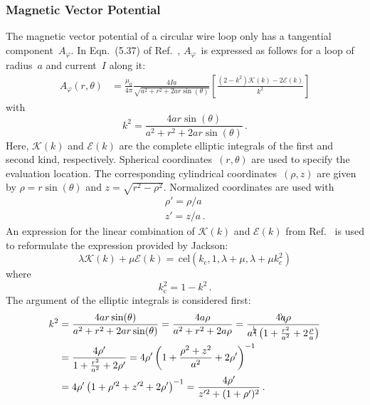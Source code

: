 \subsubsection{Magnetic Vector Potential}
The magnetic vector potential of a circular wire loop
only has a tangential component~$A_\varphi$.
In Eqn.~(5.37) of Ref.~\cite{jackson}, $A_\varphi$~is expressed as
follows for a loop of radius~$a$ and current~$I$ along it:
\begin{align}
  A_\varphi(r, \theta) &= \frac{\mu_0}{4 \pi}
                          \frac{4 I a}{\sqrt{a^2 + r^2 + 2 a r \sin(\theta)}}
                          \left[
                            \frac{(2 - k^2)\mathcal{K}(k) - 2 \mathcal{E}(k)}{k^2}
                          \right] \label{eqn:cwl_A_phi_Jackson}
\end{align}
with
\begin{equation}
  k^2 = \frac{4 a r \sin(\theta)}{a^2 + r^2 + 2 a r \sin(\theta)} \, .
\end{equation}
Here, $\mathcal{K}(k)$ and $\mathcal{E}(k)$ are the complete elliptic integrals of the first and second kind, respectively.
Spherical coordinates~$(r, \theta)$ are used to specify the evaluation location.
The corresponding cylindrical coordinates~$(\rho, z)$ are given by
$\rho = r \sin(\theta)$ and $z = \sqrt{r^2 - \rho^2}$.
Normalized coordinates are used with
\begin{align}
  \rho' = \rho / a \label{eqn:rhoP} \\
    z'  =   z  / a \label{eqn:zP} \, .
\end{align}
An expression for the linear combination of $\mathcal{K}(k)$ and $\mathcal{E}(k)$ from Ref.~\cite{bulirsch_3}
is used to reformulate the expression provided by Jackson:
\begin{equation}
  \lambda \mathcal{K}(k) + \mu \mathcal{E}(k) = \,\mathrm{cel}(k_c, 1, \lambda + \mu, \lambda + \mu k_c^2)
\end{equation}
where
\begin{equation}
  k_\mathrm{c}^2 = 1 - k^2 \, .
\end{equation}
The argument of the elliptic integrals is considered first:
\begin{align}
  k^2 &= \frac{4 a r \sin(\theta)}{a^2 + r^2 + 2 a r \sin(\theta)}
       = \frac{4 a \rho}{a^2 + r^2 + 2 a \rho}
       = \frac{4 \bcancel{a} \rho}{a^{\bcancel{2}} \left(1 + \frac{r^2}{a^2} + 2 \frac{\rho}{a} \right)} \nonumber \\
  ~   &= \frac{4 \rho'}{1 + \frac{r^2}{a^2} + 2 \rho'}
       = 4 \rho' \left( 1 + \frac{\rho^2 + z^2}{a^2} + 2 \rho' \right)^{-1} \nonumber \\
  ~   &= 4 \rho' \left( 1 + \rho'^{2} + z'^{2} + 2 \rho' \right)^{-1}
       = \frac{4 \rho'}{z'^2 + (1 + \rho')^2} \, . \label{eqn:kSq}
\end{align}
